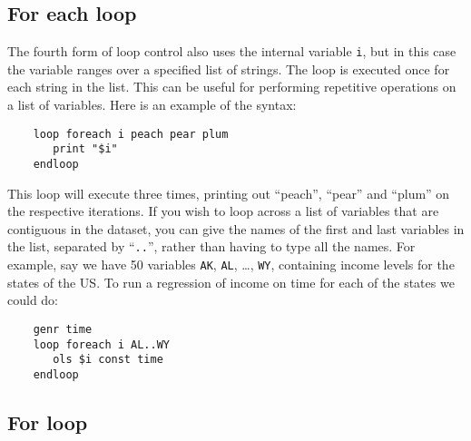 \subsection{For each loop}
\label{loop-each}

The fourth form of loop control also uses the internal
	variable \verb+i+, but in this case the variable
	ranges over a specified list of strings.  The loop is
	executed once for each string in the list.  This can be useful
	for performing repetitive operations on a list of variables.
	Here is an example of the syntax:
      
\begin{verbatim}
	loop foreach i peach pear plum
	   print "$i"
	endloop\end{verbatim}
This loop will execute three times, printing out
	   ``peach'', ``pear'' and
	   ``plum'' on the respective iterations.
      If you wish to loop across a list of variables that are
	contiguous in the dataset, you can give the names of the first
	and last variables in the list, separated by
	``\verb+..+'', rather than having to
	type all the names.  For example, say we have 50 variables
	\verb+AK+, \verb+AL+, \dots{},
	\verb+WY+, containing income levels for the states
	of the US.  To run a regression of income on time for each of
	the states we could do:
\begin{verbatim}
	genr time
	loop foreach i AL..WY
	   ols $i const time
	endloop\end{verbatim}


\subsection{For loop}
\label{loop-for}

